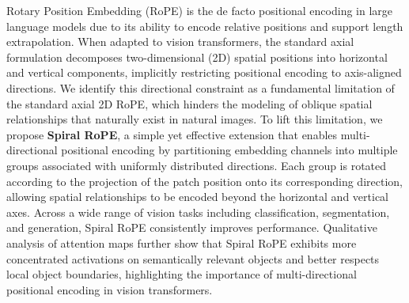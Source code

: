 
Rotary Position Embedding (RoPE) is the de facto positional encoding in large language models due to its ability to encode relative positions and support length extrapolation. When adapted to vision transformers, the standard axial formulation decomposes two-dimensional (2D) spatial positions into horizontal and vertical components, implicitly restricting positional encoding to axis-aligned directions. We identify this directional constraint as a fundamental limitation of the standard axial 2D RoPE, which hinders the modeling of oblique spatial relationships that naturally exist in natural images. To lift this limitation, we propose \textbf{Spiral RoPE}, a simple yet effective extension that enables multi-directional positional encoding by partitioning embedding channels into multiple groups associated with uniformly distributed directions. Each group is rotated according to the projection of the patch position onto its corresponding direction, allowing spatial relationships to be encoded beyond the horizontal and vertical axes. Across a wide range of vision tasks including classification, segmentation, and generation, Spiral RoPE consistently improves performance. Qualitative analysis of attention maps further show that Spiral RoPE exhibits more concentrated activations on semantically relevant objects and better respects local object boundaries, highlighting the importance of multi-directional positional encoding in vision transformers.